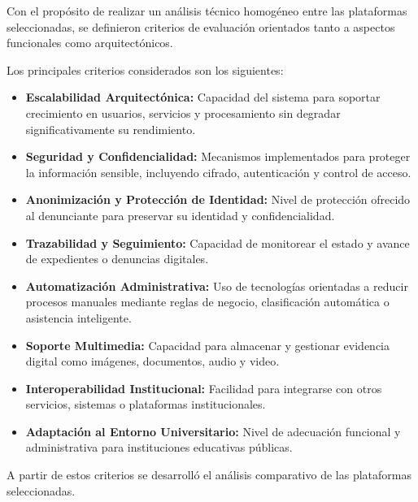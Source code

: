 \begin{flushleft}
\justifying

Con el propósito de realizar un análisis técnico homogéneo entre las plataformas seleccionadas, se definieron criterios de evaluación orientados tanto a aspectos funcionales como arquitectónicos.

Los principales criterios considerados son los siguientes:

\begin{itemize}

    \item \textbf{Escalabilidad Arquitectónica:}
    Capacidad del sistema para soportar crecimiento en usuarios, servicios y procesamiento sin degradar significativamente su rendimiento.

    \item \textbf{Seguridad y Confidencialidad:}
    Mecanismos implementados para proteger la información sensible, incluyendo cifrado, autenticación y control de acceso.

    \item \textbf{Anonimización y Protección de Identidad:}
    Nivel de protección ofrecido al denunciante para preservar su identidad y confidencialidad.

    \item \textbf{Trazabilidad y Seguimiento:}
    Capacidad de monitorear el estado y avance de expedientes o denuncias digitales.

    \item \textbf{Automatización Administrativa:}
    Uso de tecnologías orientadas a reducir procesos manuales mediante reglas de negocio, clasificación automática o asistencia inteligente.

    \item \textbf{Soporte Multimedia:}
    Capacidad para almacenar y gestionar evidencia digital como imágenes, documentos, audio y video.

    \item \textbf{Interoperabilidad Institucional:}
    Facilidad para integrarse con otros servicios, sistemas o plataformas institucionales.

    \item \textbf{Adaptación al Entorno Universitario:}
    Nivel de adecuación funcional y administrativa para instituciones educativas públicas.

\end{itemize}

A partir de estos criterios se desarrolló el análisis comparativo de las plataformas seleccionadas.

\end{flushleft}

